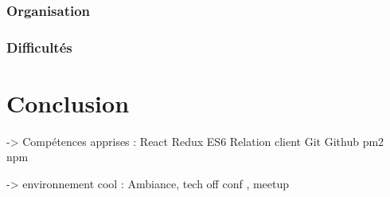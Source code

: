 \documentclass[12pt,a4paper]{article}
\begin{document}
  \subsubsection{Organisation}\label{organisation-1}

  \subsubsection{Difficultés}\label{difficultuxe9s-1}

  \section{Conclusion}\label{conclusion-1}

  -\textgreater{} Compétences apprises : React Redux ES6 Relation client
  Git Github pm2 npm

  -\textgreater{} environnement cool : Ambiance, tech off conf , meetup
\end{document}
